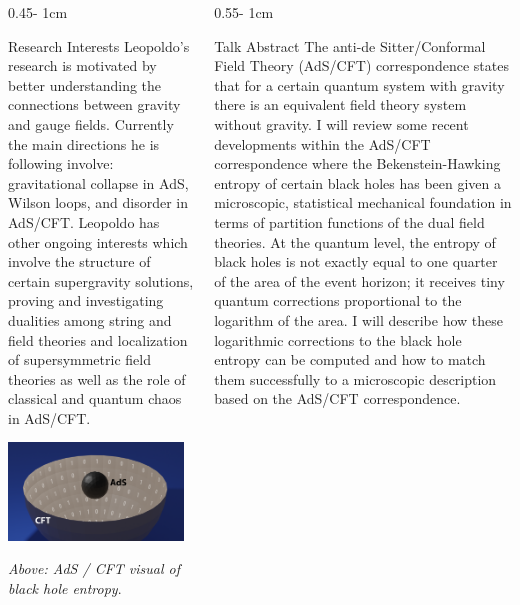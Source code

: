 \documentclass{../psuposter}
\begin{document}
\begin{frame}
\begin{columns}
\begin{column}{0.45\textwidth - 1cm}
    \begin{block}{Research Interests}
        Leopoldo's research is motivated by better understanding the connections between gravity and gauge fields. Currently the main directions he is following involve: gravitational collapse in AdS, Wilson loops, and disorder in AdS/CFT. Leopoldo has other ongoing interests which involve the structure of certain supergravity solutions, proving and investigating dualities among string and field theories and localization of supersymmetric field theories as well as the role of classical and quantum chaos in AdS/CFT. \cite{LeopoldoPandoZayas}
        \begin{center}
	    	\includegraphics[width=0.95\textwidth]{images/ads-cft-blackhole}    		
    	\end{center}
    	\textit{Above: AdS / CFT visual of black hole entropy}. \cite{zayasMicroscopicAccountBlack2020}
    \end{block}
\end{column}

\begin{column}{0.55\textwidth - 1cm}


    \begin{block}{Talk Abstract}
        The anti-de Sitter/Conformal Field Theory (AdS/CFT) correspondence states that for a certain quantum system with gravity there is an equivalent field theory system without gravity.  I will review some recent developments within the AdS/CFT correspondence where the Bekenstein-Hawking entropy of certain black holes has been given a microscopic, statistical mechanical foundation in terms of partition functions of the dual field theories. At the quantum level, the entropy of black holes is not exactly equal to one quarter of the area of the event horizon; it receives tiny quantum corrections proportional to the logarithm of the area. I will describe how these logarithmic corrections to the black hole entropy can be computed and how to match them successfully to a microscopic description based on the AdS/CFT correspondence.  
    \end{block}



\end{column}
\end{columns}
\end{frame}
\end{document}
